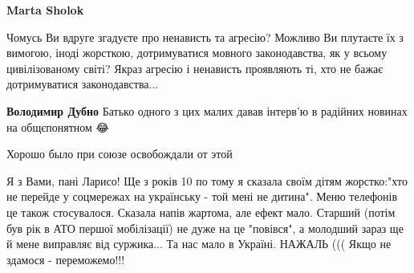 \begin{itemize}
\begin{itemize}
\begin{itemize}
 
\textbf{Marta Sholok} 

Чомусь Ви вдруге згадуєте про ненависть та агресію? Можливо Ви плутаєте їх з
вимогою, іноді жорсткою, дотримуватися мовного законодавства, як у всьому
цивілізованому світі? Якраз агресію і ненависть проявляють ті, хто не бажає
дотримуватися законодавства...

\end{itemize}

 
\textbf{Володимир Дубно} Батько одного з цих малих давав інтерв'ю в радійних новинах на общєпонятном 😂

 
Хорошо было при союзе освобождали от этой

\end{itemize}

 

Я з Вами, пані Ларисо! Ще з років 10 по тому я сказала своїм дітям
жорстко:"хто не перейде у соцмережах на українську - той мені не дитина". Меню
телефонів це також стосувалося. Сказала напів жартома, але ефект мало. Старший
(потім був рік в АТО першої мобілізації) не дуже на це "повівся", а молодший
зараз ще й мене виправляє від суржика... Та нас мало в Україні. НАЖАЛЬ ((( Якщо
не здамося - переможемо!!!

\begin{itemize}
 

\end{itemize}
\end{itemize}
